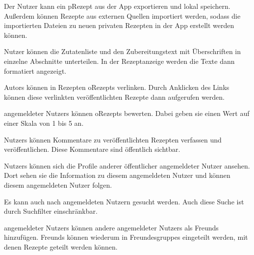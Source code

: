 Der \Gls{Nutzer} kann ein \gls{pRezept} aus der App exportieren und \gls{lokal} speichern. Außerdem können Rezepte aus externen Quellen importiert werden, sodass die importierten Dateien zu neuen privaten Rezepten in der App erstellt werden können.

Nutzer können die Zutatenliste und den Zubereitungstext mit Überschriften in einzelne Abschnitte unterteilen. 
In der Rezeptanzeige werden die Texte dann formatiert angezeigt. 


\glspl{Autor} können in Rezepten \glspl{oRezept} verlinken. Durch Anklicken des Links können diese verlinkten veröffentlichten Rezepte dann aufgerufen werden.
	
	
\Glspl{angemeldeter Nutzer} können \glspl{oRezept} bewerten. Dabei geben sie einen Wert auf einer Skala von 1 bis 5 an.


\Glspl{Nutzer} können Kommentare zu veröffentlichten Rezepten verfassen und veröffentlichen. Diese Kommentare sind öffentlich sichtbar.
	

\glspl{Nutzer} können sich die Profile anderer öffentlicher angemeldeter Nutzer ansehen. Dort sehen sie die Information zu diesem angemeldeten Nutzer und können diesem angemeldeten Nutzer folgen.


Es kann auch nach angemeldeten Nutzern gesucht werden. Auch diese Suche ist durch \gls{Suchfilter} einschränkbar.


\Glspl{angemeldeter Nutzer} können andere \glspl{angemeldeter Nutzer} als \glspl{Freund} hinzufügen. \glspl{Freund} können wiederum in \glspl{Freundesgruppe} eingeteilt werden, mit denen Rezepte geteilt werden können.


